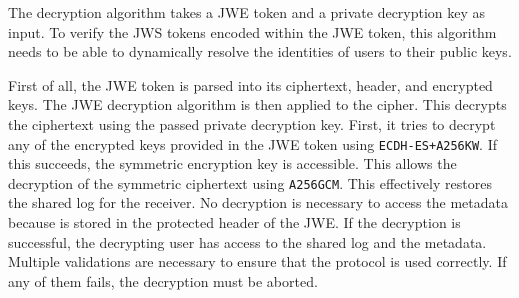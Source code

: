 \documentclass[../main.tex]{subfiles}
\begin{document}
The decryption algorithm takes a JWE token and a private decryption key as input.
To verify the JWS tokens encoded within the JWE token, this algorithm needs to be able to dynamically resolve the identities of users to their public keys.

First of all, the JWE token is parsed into its ciphertext, header, and encrypted keys.
The JWE decryption algorithm is then applied to the cipher.
This decrypts the ciphertext using the passed private decryption key.
First, it tries to decrypt any of the encrypted keys provided in the JWE token using \verb|ECDH-ES+A256KW|.
If this succeeds, the symmetric encryption key is accessible.
This allows the decryption of the symmetric ciphertext using \verb|A256GCM|.
This effectively restores the shared log for the receiver.
No decryption is necessary to access the metadata because is stored in the protected header of the JWE.
If the decryption is successful, the decrypting user has access to the shared log and the metadata.
Multiple validations are necessary to ensure that the protocol is used correctly.
If any of them fails, the decryption must be aborted.
\end{document}

